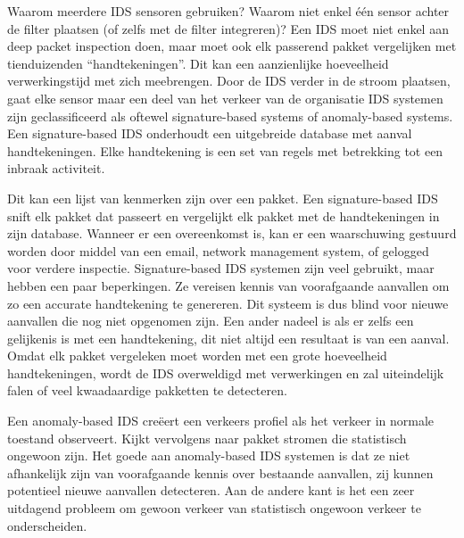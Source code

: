 \noindent Waarom meerdere IDS sensoren gebruiken? Waarom niet enkel één sensor achter de filter plaatsen (of zelfs met de filter integreren)? Een IDS moet niet enkel aan deep packet inspection doen, maar moet ook elk passerend pakket vergelijken met tienduizenden “handtekeningen”. Dit kan een aanzienlijke hoeveelheid verwerkingstijd met zich meebrengen. Door de IDS verder in de stroom plaatsen, gaat elke sensor maar een deel van het verkeer van de organisatie 
\noindent IDS systemen zijn geclassificeerd als oftewel signature-based systems of anomaly-based systems. Een signature-based IDS onderhoudt een uitgebreide database met aanval handtekeningen. Elke handtekening is een set van regels met betrekking tot een inbraak activiteit. 

\noindent Dit kan een lijst van kenmerken zijn over een pakket. Een signature-based IDS snift elk pakket dat passeert en vergelijkt elk pakket met de handtekeningen in zijn database. Wanneer er een overeenkomst is, kan er een waarschuwing gestuurd worden door middel van een email, network management system, of gelogged voor verdere inspectie. Signature-based IDS systemen zijn veel gebruikt, maar hebben een paar beperkingen. Ze vereisen kennis van voorafgaande aanvallen om zo een accurate handtekening te genereren. Dit systeem is dus blind voor nieuwe aanvallen die nog niet opgenomen zijn. Een ander nadeel is als er zelfs een gelijkenis is met een handtekening, dit niet altijd een resultaat is van een aanval. Omdat elk pakket vergeleken moet worden met een grote hoeveelheid handtekeningen, wordt de IDS overweldigd met verwerkingen en zal uiteindelijk falen of veel kwaadaardige pakketten te detecteren.

\noindent Een anomaly-based IDS creëert een verkeers profiel als het verkeer in normale toestand observeert. Kijkt vervolgens naar pakket stromen die statistisch ongewoon zijn. Het goede aan anomaly-based IDS systemen is dat ze niet afhankelijk zijn van voorafgaande kennis over bestaande aanvallen, zij kunnen potentieel nieuwe aanvallen detecteren. Aan de andere kant is het een zeer uitdagend probleem om gewoon verkeer van statistisch ongewoon verkeer te onderscheiden.
